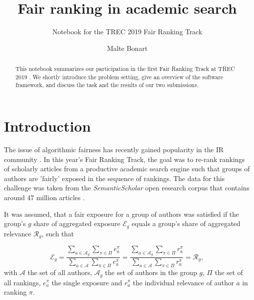 \documentclass[sigconf, nonacm]{acmart}
\begin{document}
\title{Fair ranking in academic search}
\subtitle{Notebook for the TREC 2019 Fair Ranking Track}


\author{Malte Bonart}


\begin{abstract}
This notebook summarizes our participation in the first Fair Ranking Track at TREC 2019 \cite{asia_biega_trec_2019}. We shortly introduce the problem setting, give an overview of the software framework, and discuss the task and the results of our two submissions.  
\end{abstract}


\maketitle

\section{Introduction}

The issue of algorithmic fairness has recently gained popularity in the IR community \cite{ekstrand_fairness_2019, castillo_fairness_2019}. In this year's Fair Ranking Track, the goal was to re-rank rankings of scholarly articles from a productive academic search engine such that groups of authors are 'fairly' exposed in the sequence of rankings. The data for this challenge was taken from the \emph{SemanticScholar} open research corpus that contains around 47 million articles \cite{ammar_18}. 

It was assumed, that a fair exposure for a group of authors was satisfied if the group's $g$ share of aggregated exposure $\mathcal{E}_g$ equals a group's share of aggregated relevance $\mathcal{R}_g$, such that

\begin{equation}
    \mathcal{E}_g = \frac{\sum_{a \in \mathcal{A}_g}\sum_{\pi \in \Pi}e_a^\pi}{\sum_{a \in \mathcal{A}} \sum_{\pi \in \Pi}e_a^\pi} =
    \frac{\sum_{a \in \mathcal{A}_g}\sum_{\pi \in \Pi}r_a^\pi}{\sum_{a \in \mathcal{A}} \sum_{\pi \in \Pi}r_a^\pi} = \mathcal{R}_g,
\label{eq:fairness}
\end{equation}
with $\mathcal{A}$ the set of all authors, $\mathcal{A}_g$ the set of authors in the group $g$, $\Pi$ the set of all rankings, $e^\pi_a$ the single exposure and $r^\pi_a$ the individual relevance of author $a$ in ranking $\pi$.
\end{document}
